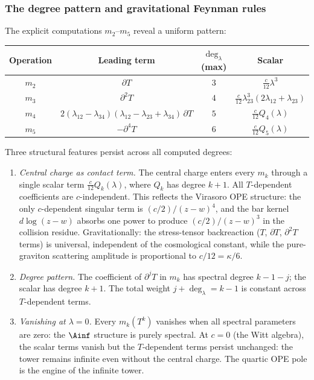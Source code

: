 \subsubsection*{The degree pattern and gravitational Feynman rules}

The explicit computations $m_2$--$m_5$ reveal a uniform pattern:

\begin{center}
\small
\renewcommand{\arraystretch}{1.3}
\begin{tabular}{@{}cccc@{}}
\textbf{Operation}
 & \textbf{Leading term}
 & \textbf{$\deg_\lambda$ (max)}
 & \textbf{Scalar} \\
\hline
$m_2$
 & $\partial T$
 & $3$
 & $\frac{c}{12}\lambda^3$ \\[3pt]
$m_3$
 & $\partial^2 T$
 & $4$
 & $\frac{c}{12}\lambda_{23}^3(2\lambda_{12}+\lambda_{23})$ \\[3pt]
$m_4$
 & $2(\lambda_{12}-\lambda_{34})(\lambda_{12}-\lambda_{23}+\lambda_{34})\,\partial T$
 & $5$
 & $\frac{c}{12}Q_4(\lambda)$ \\[3pt]
$m_5$
 & $-\partial^4 T$
 & $6$
 & $\frac{c}{12}Q_5(\lambda)$
\end{tabular}
\end{center}

\noindent
Three structural features persist across all computed degrees:
\begin{enumerate}[label=\textup{(\alph*)},nosep]
\item \textit{Central charge as contact term.}
 The central charge enters every $m_k$ through a single scalar term
 $\frac{c}{12}Q_k(\lambda)$, where $Q_k$ has degree $k+1$.
 All $T$-dependent coefficients are $c$-independent.
 This reflects the Virasoro OPE structure: the only
 $c$-dependent singular term is $(c/2)/(z-w)^4$, and the bar kernel
 $d\log(z-w)$ absorbs one power to produce
 $(c/2)/(z-w)^3$ in the collision residue.
 Gravitationally: the stress-tensor backreaction
 ($T$, $\partial T$, $\partial^2 T$ terms) is universal,
 independent of the cosmological constant,
 while the pure-graviton scattering amplitude is proportional
 to $c/12 = \kappa/6$.

\item \textit{Degree pattern.}
 The coefficient of $\partial^j T$ in $m_k$ has spectral degree
 $k - 1 - j$; the scalar has degree $k+1$.
 The total weight $j + \deg_\lambda = k-1$ is constant across
 $T$-dependent terms.

\item \textit{Vanishing at $\lambda = 0$.}
 Every $m_k(T^k)$ vanishes when all spectral parameters are zero:
 the $\Ainf$ structure is purely spectral.
 At $c = 0$ (the Witt algebra), the scalar terms vanish but the
 $T$-dependent terms persist unchanged: the tower remains infinite
 even without the central charge. The quartic OPE pole is the
 engine of the infinite tower.
\end{enumerate}

